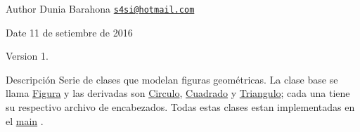 \begin{DoxyAuthor}{Author}
Dunia Barahona \href{mailto:s4si@hotmail.com}{\tt s4si@hotmail.\+com} 
\end{DoxyAuthor}
\begin{DoxyDate}{Date}
11 de setiembre de 2016 
\end{DoxyDate}
\begin{DoxyVersion}{Version}
1. 
\end{DoxyVersion}
\begin{DoxyParagraph}{Descripción}
Serie de clases que modelan figuras geométricas. La clase base se llama \hyperlink{class_figura}{Figura} y las derivadas son \hyperlink{class_circulo}{Circulo}, \hyperlink{class_cuadrado}{Cuadrado} y \hyperlink{class_triangulo}{Triangulo}; cada una tiene su respectivo archivo de encabezados. Todas estas clases estan implementadas en el \hyperlink{main_8cpp_a3c04138a5bfe5d72780bb7e82a18e627}{main} . 
\end{DoxyParagraph}
